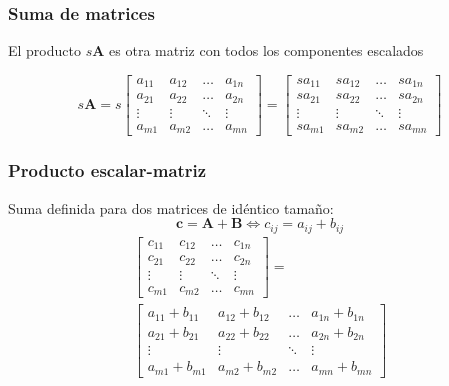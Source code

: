 \documentclass{beamer}
\begin{document}
\begin{frame}
\frametitle{Suma de matrices}
El producto $s\boldsymbol{A}$ es otra matriz con todos los componentes escalados

\begin{equation*}
s\boldsymbol{A} =s\begin{bmatrix} a_{11} &  a_{12} & \dots & a_{1n}\\ a_{21} &  a_{22} & \dots & a_{2n} \\ \vdots &  \vdots & \ddots & \vdots \\ a_{m1} &  a_{m2} & \dots & a_{mn} \end{bmatrix} = \begin{bmatrix} sa_{11} &  sa_{12} & \dots & sa_{1n}\\ sa_{21} &  sa_{22} & \dots & sa_{2n} \\ \vdots &  \vdots & \ddots & \vdots \\ sa_{m1} &  sa_{m2} & \dots & sa_{mn} \end{bmatrix} 
\end{equation*}
\end{frame}
\begin{frame}
\frametitle{Producto escalar-matriz}
Suma definida para dos matrices de idéntico tamaño:
\begin{equation*}
\boldsymbol{c}=\boldsymbol{A}+\boldsymbol{B}\Leftrightarrow c_{ij}= a_{ij}+b_{ij}
\end{equation*}
\begin{equation*}
\begin{split}
 \begin{bmatrix} c_{11} &  c_{12} & \dots & c_{1n}\\ c_{21} &  c_{22} & \dots & c_{2n} \\ \vdots &  \vdots & \ddots & \vdots \\ c_{m1} &  c_{m2} & \dots & c_{mn} \end{bmatrix} = \\ \begin{bmatrix} a_{11}+b_{11} &  a_{12}+b_{12} & \dots & a_{1n}+b_{1n}\\ a_{21}+b_{21} &  a_{22}+b_{22} & \dots & a_{2n}+b_{2n} \\ \vdots &  \vdots & \ddots & \vdots \\ a_{m1}+b_{m1} &  a_{m2}+b_{m2} & \dots & a_{mn}+b_{mn} \end{bmatrix} 
 \end{split}
\end{equation*}
\end{frame}
\end{document}
